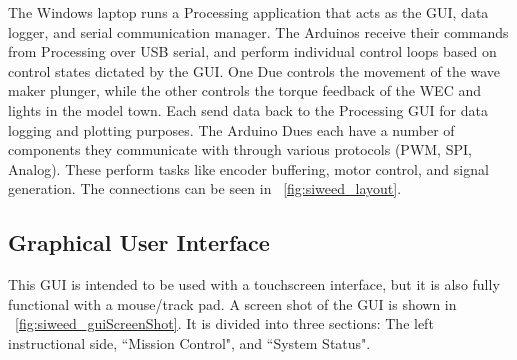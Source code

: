 \documentclass[11pt, letterpaper]{article}
\begin{document}
The Windows laptop runs a Processing application that acts as the GUI, data logger, and serial communication manager.
The Arduinos receive their commands from Processing over USB serial, and perform individual control loops based on control states dictated by the GUI.
One Due controls the movement of the wave maker plunger, while the other controls the torque feedback of the WEC and lights in the model town.
Each send data back to the Processing GUI for data logging and plotting purposes.
The Arduino Dues each have a number of components they communicate with through various protocols (PWM, SPI, Analog).
These perform tasks like encoder buffering, motor control, and signal generation.
The connections can be seen in \figurename~\ref{fig:siweed_layout}.

\subsection{Graphical User Interface}
This GUI is intended to be used with a touchscreen interface, but it is also fully functional with a mouse/track pad.
A screen shot of the GUI is shown in \figurename~\ref{fig:siweed_guiScreenShot}.
It is divided into three sections: The left instructional side, ``Mission Control", and ``System Status".
\end{document}
